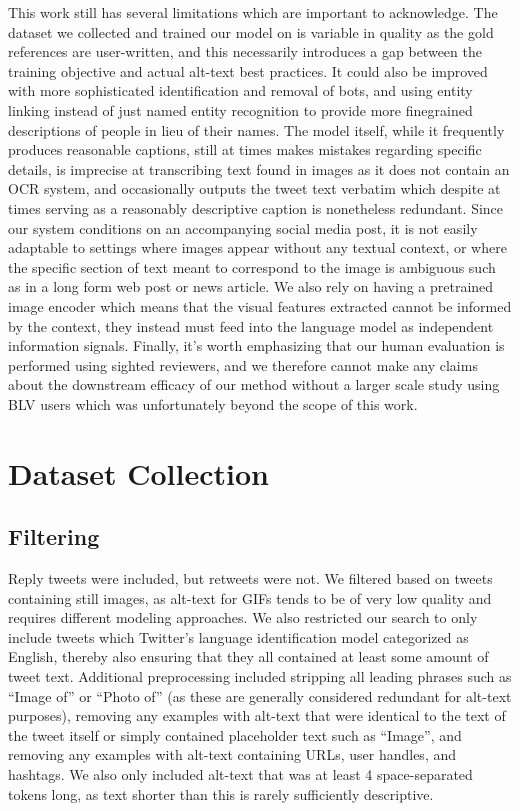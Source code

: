 \documentclass{article} %
\begin{document}
This work still has several limitations which are important to acknowledge.
The dataset we collected and trained our model on is variable in quality as the gold references are user-written, and this necessarily introduces a gap between the training objective and actual alt-text best practices.
It could also be improved with more sophisticated identification and removal of bots, and using entity linking instead of just named entity recognition to provide more finegrained descriptions of people in lieu of their names.
The model itself, while it frequently produces reasonable captions, still at times makes mistakes regarding specific details, is imprecise at transcribing text found in images as it does not contain an OCR system, and occasionally outputs the tweet text verbatim which despite at times serving as a reasonably descriptive caption is nonetheless redundant.
Since our system conditions on an accompanying social media post, it is not easily adaptable to settings where images appear without any textual context, or where the specific section of text meant to correspond to the image is ambiguous such as in a long form web post or news article.
We also rely on having a pretrained image encoder which means that the visual features extracted cannot be informed by the context, they instead must feed into the language model as independent information signals.
Finally, it's worth emphasizing that our human evaluation is performed using sighted reviewers, and we therefore cannot make any claims about the downstream efficacy of our method without a larger scale study using BLV users which was unfortunately beyond the scope of this work.

\section{Dataset Collection}
\label{sec:dataset}

\subsection{Filtering}

Reply tweets were included, but retweets were not.
We filtered based on tweets containing still images, as alt-text for GIFs tends to be of very low quality and requires different modeling approaches.
We also restricted our search to only include tweets which Twitter's language identification model categorized as English, thereby also ensuring that they all contained at least some amount of tweet text.
Additional preprocessing included stripping all leading phrases such as ``Image of'' or ``Photo of'' (as these are generally considered redundant for alt-text purposes), removing any examples with alt-text that were identical to the text of the tweet itself or simply contained placeholder text such as ``Image'', and removing any examples with alt-text containing URLs, user handles, and hashtags.
We also only included alt-text that was at least 4 space-separated tokens long, as text shorter than this is rarely sufficiently descriptive.
\end{document}
